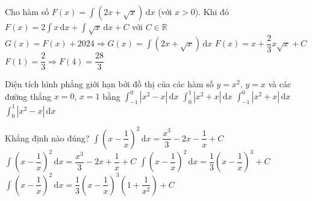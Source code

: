 \begin{ex}%
	Cho hàm số $F(x)=\displaystyle\int  \left(2x+\sqrt{x}\right)\mathrm{\,d}x$ (với $x>0$). Khi đó
	\choiceTF 
		 {\True $F(x)=2\displaystyle\int x\mathrm{\,d}x+\displaystyle\int \sqrt{x}\mathrm{\,d}x+C$ với $C\in \mathbb{R}$}
		 {\True $G(x)=F(x)+2024 \Rightarrow G(x)=\displaystyle\int \left(2x+\sqrt{x}\right)\mathrm{\,d}x$}
		{$F(x)=x+\dfrac{2}{3}x\sqrt{x}+C$} 
		{$F(1)=\dfrac{2}{3} \Rightarrow  F(4)=\dfrac{28}{3}$}
\end{ex}

\begin{ex}%
	Diện tích hình phẳng giới hạn bởi đồ thị của các hàm  số $y=x^2$, $y=x$ và các đường thẳng $x=0$, $x=1$ bằng
	 \choice
		{$\displaystyle\int_{-1}^0\left|x^2-x\right|\mathrm{\,d}x$} 
		 {$\displaystyle\int_0^1\left|x^2+x\right|\mathrm{\,d}x$}
		 {$\displaystyle\int_{-1}^0\left|x^2+x\right|\mathrm{\,d}x$}
		{\True $\displaystyle\int_0^1\left|x^2-x\right|\mathrm{\,d}x$} 
\end{ex}

\begin{ex}%
	Khẳng định  nào đúng?
	 \choice
		{\True  $\displaystyle\int\left(x-\dfrac{1}{x}\right)^2\mathrm{\,d}x=\dfrac{x^3}{3}-2x-\dfrac{1}{x}+C$}
		{$\displaystyle\int\left(x-\dfrac{1}{x}\right)^2\mathrm{\,d}x=\dfrac{x^3}{3}-2x+\dfrac{1}{x}+C$} 
		{$\displaystyle\int\left(x-\dfrac{1}{x}\right)^2\mathrm{\,d}x=\dfrac{1}{3}\left(x-\dfrac{1}{x}\right)^3+C$} 
		 {$\displaystyle\int\left(x-\dfrac{1}{x}\right)^2\mathrm{\,d}x=\dfrac{1}{3}\left(x-\dfrac{1}{x}\right)^3\left(1+\dfrac{1}{x^2}\right)+C$}
\end{ex}

